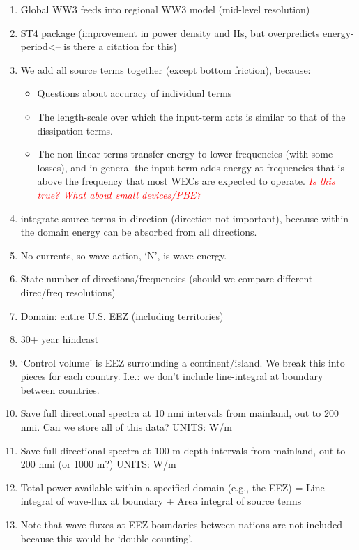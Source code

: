 \documentclass[authoryear,preprint]{elsarticle}
\newcommand{\note}[1]{\textcolor{red}{\em #1}}
\begin{document}
\begin{enumerate}
\item Global WW3 feeds into regional WW3 model (mid-level resolution)
\item ST4 package (improvement in power density and Hs, but overpredicts energy-period<-- is there a citation for this)
\item We add all source terms together (except bottom friction), because:
  \begin{itemize}
  \item Questions about accuracy of individual terms \citep{garcia-medinaWaveResourceAssessment2014}
  \item The length-scale over which the input-term acts is similar to that of the dissipation terms.
  \item The non-linear terms transfer energy to lower frequencies (with some losses), and in general the input-term adds energy at frequencies that is above the frequency that most WECs are expected to operate. \note{Is this true? What about small devices/PBE?}
  \end{itemize}
\item integrate source-terms in direction (direction not important), because within the domain energy can be absorbed from all directions.
\item No currents, so wave action, ‘N’, is wave energy.
\item State number of directions/frequencies (should we compare different direc/freq resolutions)
\item Domain: entire U.S. EEZ (including territories)
\item 30+ year hindcast
\item ‘Control volume’ is EEZ surrounding a continent/island. We break this into pieces for each country. I.e.: we don’t include line-integral at boundary between countries.
\item Save full directional spectra at 10 nmi intervals from mainland, out to 200 nmi. Can we store all of this data? UNITS: W/m
\item Save full directional spectra at 100-m depth intervals from mainland, out to 200 nmi (or 1000 m?) UNITS: W/m
\item Total power available within a specified domain (e.g., the EEZ) = Line integral of wave-flux at boundary + Area integral of source terms
\item Note that wave-fluxes at EEZ boundaries between nations are not included because this would be ‘double counting’.
\end{enumerate}
\end{document}
